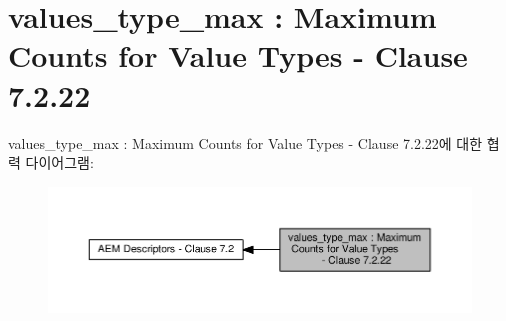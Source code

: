 \hypertarget{group__values__type__max}{}\section{values\+\_\+type\+\_\+max \+: Maximum Counts for Value Types -\/ Clause 7.2.22}
\label{group__values__type__max}
values\+\_\+type\+\_\+max \+: Maximum Counts for Value Types -\/ Clause 7.2.22에 대한 협력 다이어그램\+:
\nopagebreak
\begin{figure}[H]
\begin{center}
\leavevmode
\includegraphics[width=350pt]{group__values__type__max}
\end{center}
\end{figure}

